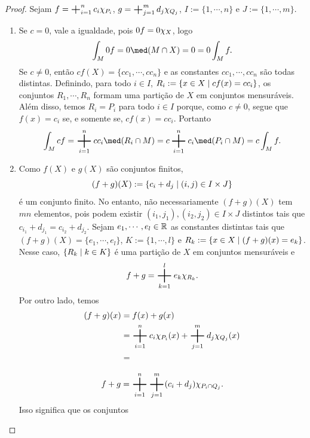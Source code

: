\begin{proof}
Sejam $f=\sum_{i=1}^n c_i \idc_{P_i}$, $g=\sum_{j=1}^m d_j \idc_{Q_j}$, $I := \{1,\cdots,n\}$ e $J := \{1,\cdots,m\}$.
\begin{enumerate}
	\item Se $c=0$, vale a igualdade, pois $0f=0\chi_X$, logo
	\begin{equation*}
	\int_M 0f = 0\med(M \cap X) = 0 = 0\int_M f.
	\end{equation*}
Se $c \neq 0$, então $cf(X)=\{cc_1,\cdots,cc_n\}$ e as constantes $cc_1,\cdots,cc_n$ são todas distintas. Definindo, para todo $i \in I$, $R_i := \left\{x \in X \;\middle\vert\; cf(x)=cc_i \right\}$, os conjuntos $R_1,\cdots,R_n$ formam uma partição de $X$ em conjuntos mensuráveis. Além disso, temos $R_i=P_i$ para todo $i \in I$ porque, como $c \neq 0$, segue que $f(x)=c_i$ se, e somente se, $cf(x)=cc_i$. Portanto
	\begin{equation*}
	\int_M cf = \sum_{i=1}^n cc_i \med(R_i \cap M) = c\bigplus_{i=1}^n c_i \med(P_i \cap M) = c\int_M f.
	\end{equation*}
	
	\item Como $f(X)$ e $g(X)$ são conjuntos finitos,
	\begin{equation*}
	(f+g)(X) := \left\{c_i+d_j \;\middle\vert\; (i,j) \in I \times J \right\}
	\end{equation*}
é um conjunto finito. No entanto, não necessariamente $(f+g)(X)$ tem $mn$ elementos, pois podem existir $(i_1,j_1),(i_2,j_2) \in I \times J$ distintos tais que $c_{i_1}+d_{j_1}=c_{i_2}+d_{j_2}$. Sejam $e_1,\cdots,e_l \in \mathbb{R}$ as constantes distintas tais que $(f+g)(X)=\{e_1,\cdots,e_l\}$, $K := \{1,\cdots,l\}$ e $R_k := \left\{x \in X \;\middle\vert\; (f+g)(x)=e_k \right\}$. Nesse caso, $\left\{R_k \;\middle\vert\; k \in K \right\}$ é uma partição de $X$ em conjuntos mensuráveis e
	\begin{equation*}
	f+g=\sum_{k=1}^l e_k \idc_{R_k}.
	\end{equation*}
Por outro lado, temos
	\begin{align*}
	(f+g)(x) &= f(x)+g(x) \\
				&= \sum_{i=1}^n c_i \idc_{P_i}(x) + \sum_{j=1}^m d_j \idc_{Q_j}(x) \\
				&= 
	\end{align*}
	

	\begin{equation*}
	f+g = \sum_{i=1}^n \sum_{j=1}^m (c_i+d_j) \idc_{P_i \cap Q_j}.
	\end{equation*}
 Isso significa que os conjuntos
\end{enumerate}
\end{proof}

